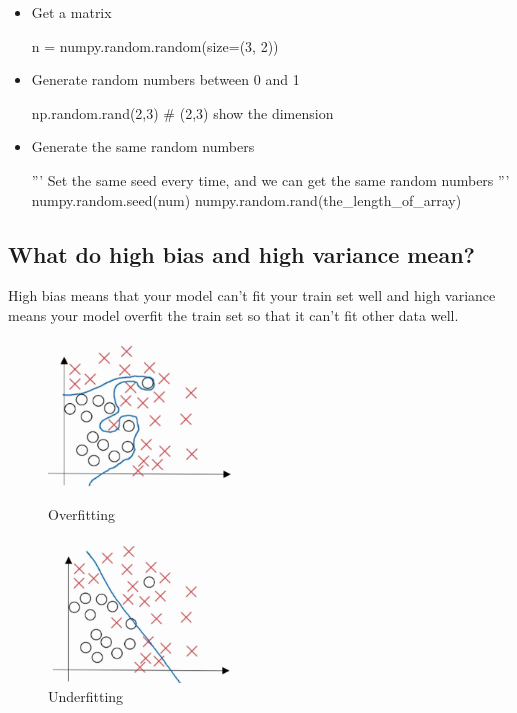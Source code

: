 \documentclass[10pt]{article}
\begin{document}
\begin{enumerate}
\begin{itemize}
\item Get a matrix
\begin{python}
n = numpy.random.random(size=(3, 2))
\end{python}

\item Generate random numbers between 0 and 1
\begin{python}
np.random.rand(2,3) # (2,3) show the dimension
\end{python}

\item Generate the same random numbers
\begin{python}
'''
Set the same seed every time,
and we can get the same random numbers
'''
numpy.random.seed(num)
numpy.random.rand(the_length_of_array)

\end{python}

\end{itemize}


\end{enumerate} 




\subsection{What do high bias and high variance mean?}
\indent High bias means that your model can't fit your train set well and high variance means your model overfit the train set so that it can't fit other data well.

\begin{figure}[htbp]

\begin{minipage}[t]{0.45\linewidth}
\centering
\includegraphics[width=5cm]{overfit.png}
\caption{Overfitting}
\label{overfitting}
\end{minipage}
\hfill %
\begin{minipage}[t]{0.45\linewidth}
\centering
\includegraphics[width=5cm]{underfitting.png}
\caption{Underfitting}
\label{underfitting}
\end{minipage}
\end{figure}
\end{document}
